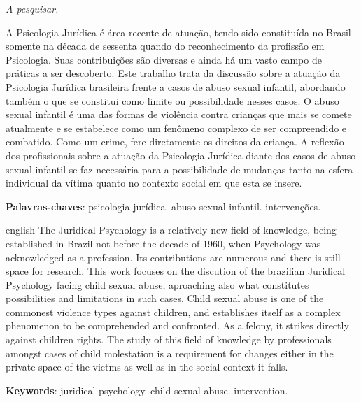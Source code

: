 \documentclass[12pt,oneside,a4paper,english,french,spanish]{abntex2}
\begin{document}
\begin{epigrafe}
    \vspace*{\fill}
	\begin{flushright}
		\textit{A pesquisar.}
	\end{flushright}
\end{epigrafe}


\begin{resumo}
  A Psicologia Jurídica é área recente de atuação, tendo sido constituída no Brasil somente na década de sessenta quando do reconhecimento da profissão em Psicologia. Suas contribuições são diversas e ainda há um vasto campo de práticas a ser descoberto. Este trabalho trata da discussão sobre a atuação da Psicologia Jurídica brasileira frente a casos de abuso sexual infantil, abordando também o que se constitui como limite ou possibilidade nesses casos. O abuso sexual infantil é uma das formas de violência contra crianças que mais se comete atualmente e se estabelece como um fenômeno complexo de ser compreendido e combatido. Como um crime, fere diretamente os direitos da criança. A reflexão dos profissionais sobre a atuação da Psicologia Jurídica diante dos casos de abuso sexual infantil se faz necessária para a possibilidade de mudanças tanto na esfera individual da vítima quanto no contexto social em que esta se insere.

  \vspace{\onelineskip}
    
  \noindent
  \textbf{Palavras-chaves}: psicologia jurídica. abuso sexual infantil. intervenções.
\end{resumo}

\begin{resumo}[Abstract]
  \begin{otherlanguage*}{english}
    The Juridical Psychology is a relatively new field of knowledge, being established in Brazil not before the decade of 1960, when Psychology was acknowledged as a profession. Its contributions are numerous and there is still space for research. This work focuses on the discution of the brazilian Juridical Psychology facing child sexual abuse, aproaching also what constitutes possibilities and limitations in such cases. Child sexual abuse is one of the commonest violence types against children, and establishes itself as a complex phenomenon to be comprehended and confronted. As a felony, it strikes directly against children rights. The study of this field of knowledge by professionals amongst cases of child molestation is a requirement for changes either in the private space of the victms as well as in the social context it falls.

    \vspace{\onelineskip}
 
    \noindent 
    \textbf{Keywords}: juridical psychology. child sexual abuse. intervention.
  \end{otherlanguage*}
\end{resumo}
\end{document}
